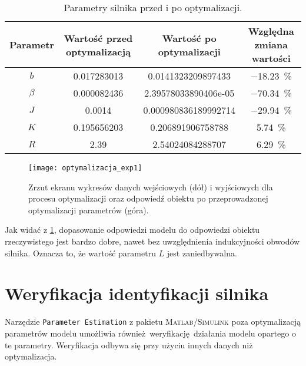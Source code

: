 \begin{table}[h]
    \centering
    \begin{threeparttable}
        \caption{Parametry silnika przed i po optymalizacji.}
        \label{tab:parametry_silnika_optymalizacja}
        
        \begin{tabular}{c | S[round-mode=places, round-precision=6] | S[round-mode=places, round-precision=6] | c}
            \toprule
            Parametr & {Wartość przed optymalizacją} & {Wartość po optymalizacji} & Względna zmiana wartości \\
            \midrule
            $b$ & 0.017283013 & 0.0141323209897433 & \SI{-18,23}{\percent} \\
            $\beta$ & 0.000082436 & 2.39578033890406e-05 & \SI{-70,34}{\percent} \\
            $J$ & 0.0014 & 0.000980836189992714 & \SI{-29,94}{\percent} \\
            $K$ & 0.195656203 & 0.206891906758788 & \SI{5,74}{\percent} \\
            $R$ & 2.39 & 2.54024084288707 & \SI{6,29}{\percent} \\
            \bottomrule
        \end{tabular}
    \end{threeparttable}
\end{table}

\begin{figure}[H]
    \centering
    \texttt{[image: optymalizacja\_exp1]}
    \caption{Zrzut ekranu wykresów danych wejściowych (dół) i wyjściowych dla procesu optymalizacji oraz odpowiedź obiektu po przeprowadzonej optymalizacji parametrów (góra).}
    \label{fig:silnik_oszacowanie_parametrow}
\end{figure}

Jak widać z \cref{fig:silnik_oszacowanie_parametrow}, dopasowanie odpowiedzi modelu do odpowiedzi obiektu rzeczywistego jest bardzo dobre, nawet bez uwzględnienia indukcyjności obwodów silnika. Oznacza to, że wartość parametru $L$ jest zaniedbywalna.

\section{Weryfikacja identyfikacji silnika}
\label{sec:ch5_weryfikacja_identyfikacji_silnika}

Narzędzie \texttt{Parameter Estimation} z pakietu \textsc{Matlab/Simulink} poza optymalizacją parametrów modelu umożliwia również weryfikację działania modelu opartego o te parametry. Weryfikacja odbywa się przy użyciu innych danych niż optymalizacja.

